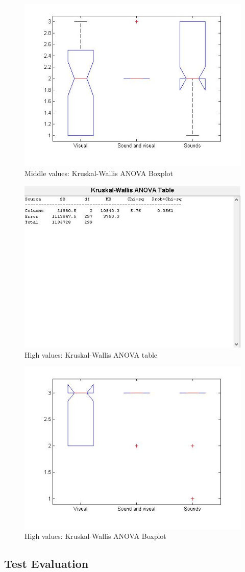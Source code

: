 \begin{figure}[!htbp]
    \centering
    \includegraphics[width=.5\textwidth]{images/boxplotMiddle.jpg}
    \caption{Middle values: Kruskal-Wallis ANOVA Boxplot}
    \label{fig:boxplotMiddle}
\end{figure}

\begin{figure}[!htbp]
    \centering
    \includegraphics[width=.5\textwidth]{images/tableHigh.jpg}
    \caption{High values: Kruskal-Wallis ANOVA table}
    \label{fig:tableLow}
\end{figure}

\begin{figure}[!htbp]
    \centering
    \includegraphics[width=.5\textwidth]{images/boxplotHigh.jpg}
    \caption{High values: Kruskal-Wallis ANOVA Boxplot}
    \label{fig:boxplotHigh}
\end{figure}


\subsection{Test Evaluation}


